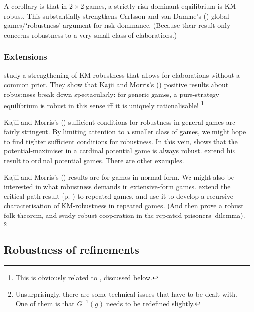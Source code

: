 \documentclass[11pt,letterpaper,reqno,oneside]{article}
\begin{document}
A corollary is that in $2 \times 2$ games, a strictly risk-dominant equilibrium is KM-robust. This substantially strengthens Carlsson and van Damme's (\citeyear{CarlssonVandamme1993}) global-games/`robustness' argument for risk dominance. (Because their result only concerns robustness to a very small class of elaborations.)



\subsubsection{Extensions}
\label{sec:robustness:KajiiMorris:extensions}

\textcite{OyamaTercieux2010} study a strengthening of KM-robustness that allows for elaborations without a common prior. They show that Kajii and Morris's (\citeyear{KajiiMorris1997ecta}) positive results about robustness break down spectacularly: for generic games, a pure-strategy equilibrium is robust in this sense iff it is uniquely rationalisable!%
	\footnote{This is obviously related to \textcite{WeinsteinYildiz2007}, discussed below.}

Kajii and Morris's (\citeyear{KajiiMorris1997ecta}) sufficient conditions for robustness in general games are fairly stringent. By limiting attention to a smaller class of games, we might hope to find tighter sufficient conditions for robustness. In this vein, \textcite{Ui2001} shows that the potential-maximiser in a cardinal potential game is always robust. \textcite{MorrisUi2005} extend his result to ordinal potential games. There are other examples.

Kajii and Morris's (\citeyear{KajiiMorris1997ecta}) results are for games in normal form. We might also be interested in what robustness demands in extensive-form games. \textcite{ChassangTakahashi2011} extend the critical path result (p. \pageref{theorem:MS_Cp_properties_1/2}) to repeated games, and use it to develop a recursive characterisation of KM-robustness in repeated games. (And then prove a robust folk theorem, and study robust cooperation in the repeated prisoners' dilemma).%
	\footnote{Unsurprisingly, there are some technical issues that have to be dealt with. One of them is that $G^{-1}(g)$ needs to be redefined slightly.}



\subsection{Robustness of refinements}
\label{sec:robustness:refinement_robustness}
\end{document}
